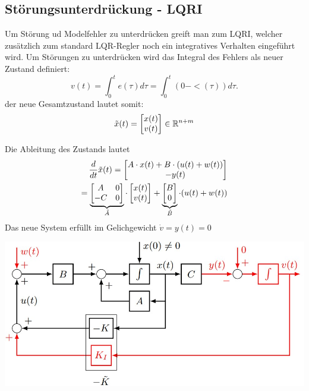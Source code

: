 \subsection{Störungsunterdrückung - LQRI}
Um Störung ud Modelfehler zu unterdrücken greift man zum LQRI, welcher zusätzlich zum standard LQR-Regler noch ein integratives Verhalten eingeführt wird. Um Störungen zu unterdrücken wird das Integral des Fehlers als neuer Zustand definiert: \[ v(t) = \int^t_0 e(\tau)d\tau = \int^t_0 (0-<(\tau))d\tau.\]
der neue Gesamtzustand lautet somit: \[\Tilde{x}(t) =\begin{bmatrix}
x(t) \\ v(t)
\end{bmatrix}\in \mathbb{R}^{n+m}\]

Die Ableitung des Zustands lautet
\begin{align*}
    \frac{d}{dt}\Tilde{x}(t) = \begin{bmatrix}A\cdot x(t) + B \cdot ( u(t) + w(t))\\-y(t)\end{bmatrix}\\
    = \underbrace{\begin{bmatrix}A&0\\-C & 0\end{bmatrix}}_{\Tilde{A}}\cdot\begin{bmatrix}x(t) \\v(t)\end{bmatrix}+\underbrace{\begin{bmatrix}B \\ 0 \end{bmatrix}}_{\Tilde{B}} \cdot(u(t)+w(t))
\end{align*}
Das neue System erfüllt im Gelichgewicht $\dot v = y(t) = 0$

\includegraphics[width=0.8\linewidth]{images/08/LQRI.jpg}

